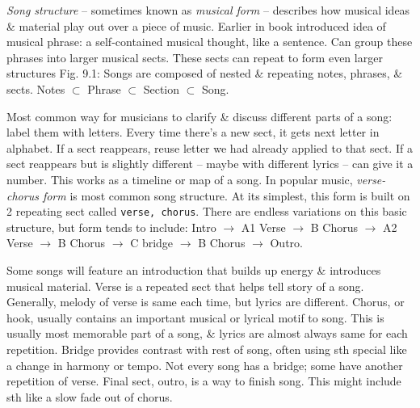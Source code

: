 \documentclass{article}
\begin{document}
\begin{itemize}
\begin{itemize}
		{\it Song structure} -- sometimes known as {\it musical form} -- describes how musical ideas \& material play out over a piece of music. Earlier in book introduced idea of musical phrase: a self-contained musical thought, like a sentence. Can group these phrases into larger musical sects. These sects can repeat to form even larger structures {\sf Fig. 9.1: Songs are composed of nested \& repeating notes, phrases, \& sects.} Notes $\subset$ Phrase $\subset$ Section $\subset$ Song.
		
		Most common way for musicians to clarify \& discuss different parts of a song: label them with letters. Every time there's a new sect, it gets next letter in alphabet. If a sect reappears, reuse letter we had already applied to that sect. If a sect reappears but is slightly different -- maybe with different lyrics -- can give it a number. This works as a timeline or map of a song. In popular music, {\it verse-chorus form} is most common song structure. At its simplest, this form is built on 2 repeating sect called {\tt verse, chorus}. There are endless variations on this basic structure, but form tends to include: Intro $\to$ A1 Verse $\to$ B Chorus $\to$ A2 Verse $\to$ B Chorus $\to$ C bridge $\to$ B Chorus $\to$ Outro.
		
		Some songs will feature an introduction that builds up energy \& introduces musical material. Verse is a repeated sect that helps tell story of a song. Generally, melody of verse is same each time, but lyrics are different. Chorus, or hook, usually contains an important musical or lyrical motif to song. This is usually most memorable part of a song, \& lyrics are almost always same for each repetition. Bridge provides contrast with rest of song, often using sth special like a change in harmony or tempo. Not every song has a bridge; some have another repetition of verse. Final sect, outro, is a way to finish song. This might include sth like a slow fade out of chorus.
		

\end{itemize}
\end{itemize}
\end{document}
